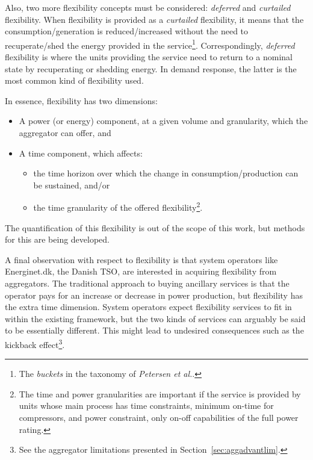 Also, two more flexibility concepts must be considered: \emph{deferred} and \emph{curtailed} flexibility. When flexibility is provided as a \emph{curtailed} flexibility,  it means that the consumption/generation is reduced/increased without the need to recuperate/shed the energy provided in the service\footnote{The \emph{buckets} in the taxonomy of \emph{Petersen et al.}.}. Correspondingly, \emph{deferred} flexibility is where the units providing the service need to return to a nominal state by recuperating or shedding energy. In demand response, the latter is the most common kind of flexibility used.

In essence, flexibility has two dimensions:
\begin{itemize}
	\item A power (or energy) component, at a given volume and granularity, which the aggregator can offer, and
	\item A time component, which affects:
		\begin{itemize}
			\item the time horizon over which the change in consumption/production can be sustained, and/or
			\item the time granularity of the offered flexibility\footnote{The time and power granularities are important if the service is provided by units whose main process has time constraints, \eg minimum on-time for compressors, and power constraint, \eg only on-off capabilities of the full power rating.}.
		\end{itemize}
\end{itemize}
The quantification of this flexibility is out of the scope of this work, but methods for this are being developed.

A final observation with respect to flexibility is that system operators like Energinet.dk, the Danish TSO, are interested in acquiring flexibility from aggregators. The traditional approach to buying ancillary services is that the operator pays for an increase or decrease in power production, but flexibility has the extra time dimension. System operators expect flexibility services to fit in within the existing framework, but the two kinds of services can arguably be said to be essentially different. This might lead to undesired consequences such as the kickback effect\footnote{See the aggregator limitations presented in Section~\ref{sec:aggadvantlim}.}. 

